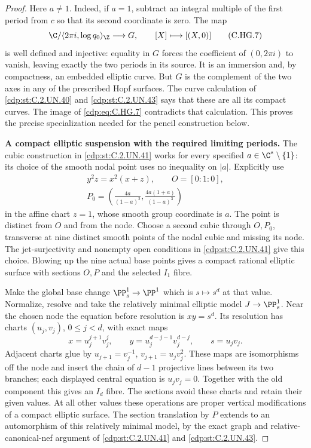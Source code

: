 \begin{proof}
Here $a\ne1$. Indeed, if $a=1$, subtract an
integral multiple of the first period from $c$
so that its second coordinate is zero. The map
\[
 \C/\langle2\pi i,\log q_0\rangle_{\Z}
          \longrightarrow G,\qquad [X]\longmapsto[(X,0)]
\tag{C.HG.7}\label{cdp:eq:C.HG.7}
\]
is well defined and injective: equality in $G$
forces the coefficient of $(0,2\pi i)$ to vanish,
leaving exactly the two periods in its source.
It is an immersion and, by compactness, an embedded
elliptic curve. But $G$ is the complement of the
two axes in any of the prescribed Hopf surfaces.
The curve calculation of \ref{cdp:st:C.2.UN.40} and \ref{cdp:st:C.2.UN.43}
says that these are all its compact curves.
The image of \eqref{cdp:eq:C.HG.7} contradicts that calculation.
This proves the precise specialization needed
for the pencil construction below.

\par\medskip\noindent\textbf{A compact elliptic suspension with the required limiting periods.}
The cubic construction in \ref{cdp:st:C.2.UN.41} works for
every specified $a\in\C^*\setminus\{1\}$:
its choice of the smooth nodal point uses no
inequality on $|a|$. Explicitly use
\[
 \begin{gathered}
 y^2z=x^2(x+z),\qquad O=[0:1:0],\\
 P_0=\left(\frac{4a}{(1-a)^2},
                  \frac{4a(1+a)}{(1-a)^3}\right)
 \end{gathered}
\tag{C.HG.8}\label{cdp:eq:C.HG.8}
\]
in the affine chart $z=1$, whose smooth group
coordinate is $a$. The point is distinct from
$O$ and from the node. Choose a second cubic
through $O,P_0$, transverse at nine distinct
smooth points of the nodal cubic and missing
its node. The jet-surjectivity and nonempty
open conditions in \ref{cdp:st:C.2.UN.41} give this choice.
Blowing up the nine actual base points gives
a compact rational elliptic surface with
sections $O,P$ and the selected $I_1$ fibre.

Make the global base change $\PP^1_s\to\PP^1$
which is $s\mapsto s^d$ at that value.
Normalize, resolve and take the relatively
minimal elliptic model $J\to\PP^1_s$.
Near the chosen node the equation before
resolution is $xy=s^d$. Its resolution has
charts $(u_j,v_j)$, $0\le j<d$, with exact maps
\[
 x=u_j^{j+1}v_j^j,\qquad
 y=u_j^{d-j-1}v_j^{d-j},\qquad s=u_jv_j.
\]
Adjacent charts glue by
$u_{j+1}=v_j^{-1}$, $v_{j+1}=u_jv_j^2$.
These maps are isomorphisms off the node and
insert the chain of $d-1$ projective lines
between its two branches; each displayed
central equation is $u_jv_j=0$.
Together with the old component
this gives an $I_d$ fibre. The sections avoid
these charts and retain their given values.
At all other values these operations are
proper vertical modifications of a compact
elliptic surface. The section translation by
$P$ extends to an automorphism of this
relatively minimal model, by the exact graph
and relative-canonical-nef argument of
\ref{cdp:st:C.2.UN.41} and \ref{cdp:st:C.2.UN.43}.


\end{proof}
